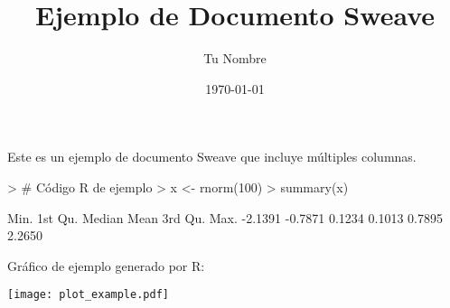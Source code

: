\documentclass{article}
\begin{document}


\title{Ejemplo de Documento Sweave}
\author{Tu Nombre}
\date{\today}

\maketitle

\begin{multicols}{2}
Este es un ejemplo de documento Sweave que incluye múltiples columnas.

\begin{Schunk}
\begin{Sinput}
> # Código R de ejemplo
> x <- rnorm(100)
> summary(x)
\end{Sinput}
\begin{Soutput}
   Min. 1st Qu.  Median    Mean 3rd Qu.    Max. 
-2.1391 -0.7871  0.1234  0.1013  0.7895  2.2650 
\end{Soutput}
\end{Schunk}

Gráfico de ejemplo generado por R:

\texttt{[image: plot\_example.pdf]}

\end{multicols}
\end{document}
